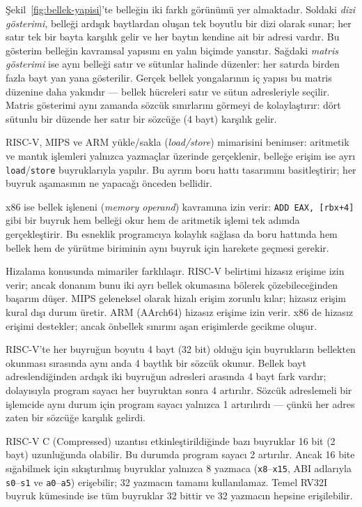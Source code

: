Şekil~\ref{fig:bellek-yapisi}'te belleğin iki farklı görünümü yer almaktadır. Soldaki \emph{dizi gösterimi}, belleği ardışık baytlardan oluşan tek boyutlu bir dizi olarak sunar; her satır tek bir bayta karşılık gelir ve her baytın kendine ait bir adresi vardır. Bu gösterim belleğin kavramsal yapısını en yalın biçimde yansıtır. Sağdaki \emph{matris gösterimi} ise aynı belleği satır ve sütunlar halinde düzenler: her satırda birden fazla bayt yan yana gösterilir. Gerçek bellek yongalarının iç yapısı bu matris düzenine daha yakındır --- bellek hücreleri satır ve sütun adresleriyle seçilir. Matris gösterimi aynı zamanda sözcük sınırlarını görmeyi de kolaylaştırır: dört sütunlu bir düzende her satır bir sözcüğe (4 bayt) karşılık gelir.

\begin{karsilastirma}
RISC-V, MIPS ve ARM yükle/sakla (\emph{load/store}) mimarisini benimser: aritmetik ve mantık işlemleri yalnızca yazmaçlar üzerinde gerçeklenir, belleğe erişim ise ayrı \texttt{load}/\texttt{store} buyruklarıyla yapılır. Bu ayrım boru hattı tasarımını basitleştirir; her buyruk aşamasının ne yapacağı önceden bellidir.

x86 ise bellek işleneni (\emph{memory operand}) kavramına izin verir: \texttt{ADD EAX, [rbx+4]} gibi bir buyruk hem belleği okur hem de aritmetik işlemi tek adımda gerçekleştirir. Bu esneklik programcıya kolaylık sağlasa da boru hattında hem bellek hem de yürütme biriminin aynı buyruk için harekete geçmesi gerekir.

Hizalama konusunda mimariler farklılaşır. RISC-V belirtimi hizasız erişime izin verir; ancak donanım bunu iki ayrı bellek okumasına bölerek çözebileceğinden başarım düşer. MIPS geleneksel olarak hizalı erişim zorunlu kılar; hizasız erişim kural dışı durum üretir. ARM (AArch64) hizasız erişime izin verir. x86 de hizasız erişimi destekler; ancak önbellek sınırını aşan erişimlerde gecikme oluşur.
\end{karsilastirma}

RISC-V'te her buyruğun boyutu 4 bayt (32 bit) olduğu için buyrukların bellekten okunması sırasında aynı anda 4 baytlık bir sözcük okunur. Bellek bayt adreslendiğinden ardışık iki buyruğun adresleri arasında 4 bayt fark vardır; dolayısıyla program sayacı her buyruktan sonra 4 artırılır. Sözcük adreslemeli bir işlemcide aynı durum için program sayacı yalnızca 1 artırılırdı --- çünkü her adres zaten bir sözcüğe karşılık gelirdi.

\begin{bilginot}
RISC-V C (Compressed) uzantısı etkinleştirildiğinde bazı buyruklar 16 bit (2 bayt) uzunluğunda olabilir. Bu durumda program sayacı 2 artırılır. Ancak 16 bite sığabilmek için sıkıştırılmış buyruklar yalnızca 8 yazmaca (\texttt{x8}--\texttt{x15}, ABI adlarıyla \texttt{s0}--\texttt{s1} ve \texttt{a0}--\texttt{a5}) erişebilir; 32 yazmacın tamamı kullanılamaz. Temel RV32I buyruk kümesinde ise tüm buyruklar 32 bittir ve 32 yazmacın hepsine erişilebilir.
\end{bilginot}

